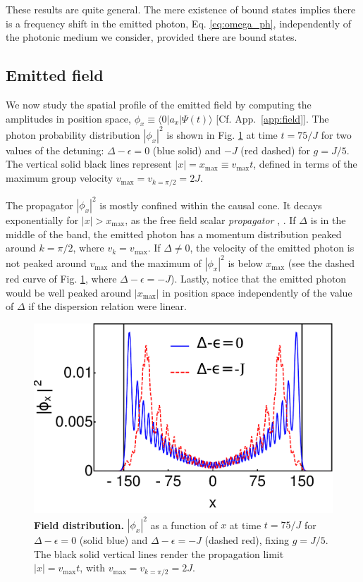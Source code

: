 \documentclass[aps,pra,twocolumn,floatfix,superscriptaddress]{revtex4-1}%
\begin{document}
{\color{blue}These results are quite general. The mere existence of bound states implies there is a frequency shift in the emitted photon, Eq. \eqref{eq:omega_ph}, independently of the photonic medium we consider, provided there are bound states.}


\subsection{Emitted field}

We now study the spatial profile of the emitted field by computing the amplitudes in position space, $\phi_x\equiv \langle 0|a_x|\Psi(t)\rangle$ [Cf. App.\ \ref{app:field}]. The photon probability distribution $|\phi_x|^2$ is shown in Fig. \ref{fig:w_n} at time $t=75/J$ for two values of the detuning: $\Delta-\epsilon=0$ (blue solid) and $-J$ (red dashed) for $g=J/5$. The vertical solid black lines represent $|x|=x_\text{max}\equiv v_\text{max}t$, defined in terms of the maximum group velocity $v_\text{max}= v_{k=\pi/2}=2J$. 

The propagator $|\phi_x|^2$ is mostly confined within the causal cone. It decays exponentially for $|x|>x_\text{max}$, as the free field scalar {\it propagator} \cite[Sect. 4.5]{Greiner-fq}, \cite[Sect. 2]{Peskin}. If $\Delta$ is in the middle of the band, the emitted photon has a momentum distribution peaked around $k=\pi/2$, where $v_k=v_\text{max}$. {\color{blue}If $\Delta\neq 0$, the velocity of the emitted photon is not peaked around $v_\text{max}$ and the maximum of $|\phi_x|^2$ is below $x_\text{max}$ (see the dashed red curve of Fig. \ref{fig:w_n}, where $\Delta-\epsilon=-J$)}. {\color{blue}Lastly, notice that the emitted photon would be well peaked around $|x_\text{max}|$ in position space independently of the value of $\Delta$ if the dispersion relation were linear.}


\begin{figure}[thb!]
\includegraphics[width=1.0\columnwidth]{wx_g_0_2_Delta_0_-1.pdf}
\caption{{\bf Field distribution.} $|\phi_x|^2$ as a function of $x$ at time $t=75/J$ for $\Delta-\epsilon=0$ (solid blue) and $\Delta-\epsilon=-J$ (dashed red), fixing $g=J/5$. The black solid vertical lines render the propagation limit $|x|=v_\text{max}t$, with $v_\text{max}=v_{k=\pi/2}=2J$.}\label{fig:w_n}
\end{figure}
\end{document}
